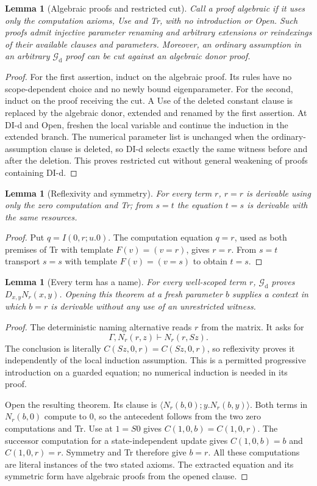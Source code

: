 \documentclass[11pt,letterpaper]{article}
\newtheorem{lemma}[theorem]{Lemma}
\theoremstyle{definition}\newtheorem{definition}[theorem]{Definition}
\theoremstyle{remark}\newtheorem{remark}[theorem]{Remark}
\begin{document}
\begin{lemma}[Algebraic proofs and restricted cut]
Call a proof algebraic if it uses only the computation axioms, Use and Tr,
with no introduction or Open. Such proofs admit injective parameter renaming
and arbitrary extensions or reindexings of their available clauses and
parameters. Moreover, an ordinary assumption in an arbitrary
$\mathcal G_{\mathrm d}$ proof can be cut against an algebraic donor proof.
\end{lemma}
\begin{proof}
For the first assertion, induct on the algebraic proof. Its rules have no
scope-dependent choice and no newly bound eigenparameter. For the second,
induct on the proof receiving the cut. A Use of the deleted constant clause
is replaced by the algebraic donor, extended and renamed by the first
assertion. At DI-d and Open, freshen the local variable and continue the
induction in the extended branch. The numerical parameter list is unchanged
when the ordinary-assumption clause is deleted, so DI-d selects exactly the
same witness before and after the deletion. This proves restricted cut
without general weakening of proofs containing DI-d.
\end{proof}

\begin{lemma}[Reflexivity and symmetry]
For every term $r$, $r=r$ is derivable using only the zero computation and Tr;
from $s=t$ the equation $t=s$ is derivable with the same resources.
\end{lemma}
\begin{proof}
Put $q=I(0,r;u.0)$. The computation equation $q=r$, used as both premises of
Tr with template $F(v)=(v=r)$, gives $r=r$. From $s=t$ transport $s=s$ with
template $F(v)=(v=s)$ to obtain $t=s$.
\end{proof}

\begin{lemma}[Every term has a name]
For every well-scoped term $r$, $\mathcal G_{\mathrm d}$ proves
$D_{x,y}N_r(x,y)$. Opening this theorem at a fresh parameter $b$ supplies a
context in which $b=r$ is derivable without any use of an unrestricted witness.
\end{lemma}
\begin{proof}
The deterministic naming alternative reads $r$ from the matrix. It asks for
\[
 \Gamma,N_r(r,z)\vdash N_r(r,Sz).
\]
The conclusion is literally
$C(Sz,0,r)=C(Sz,0,r)$, so reflexivity proves it independently of the local
induction assumption. This is a permitted progressive introduction on a
guarded equation; no numerical induction is needed in its proof.

Open the resulting theorem. Its clause is
$\langle N_r(b,0);y.N_r(b,y)\rangle$. Both terms in $N_r(b,0)$ compute to
$0$, so the antecedent follows from the two zero computations and Tr.
Use at $1=S0$ gives $C(1,0,b)=C(1,0,r)$. The successor computation for a
state-independent update gives $C(1,0,b)=b$ and $C(1,0,r)=r$. Symmetry and Tr
therefore give $b=r$. All these computations are literal instances of the
two stated axioms. The extracted equation and its symmetric form have
algebraic proofs from the opened clause.
\end{proof}
\end{document}

